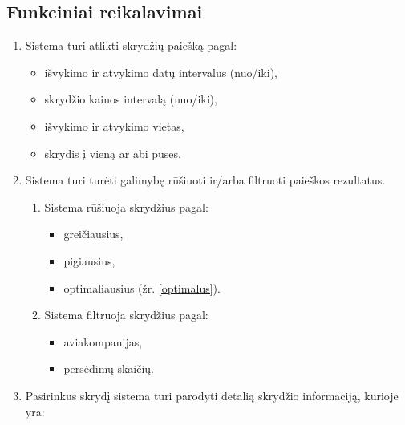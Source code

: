 \documentclass{VUMIFPSkursinis}
\begin{document}
            \subsection{Funkciniai reikalavimai}
                \begin{enumerate}[label=\textbf{FR\arabic*}.]
                	\subsubsection{Bendri sistemos funkciniai reikalavimai}
                		\item Sistema turi atlikti skrydžių paiešką pagal:
                    	\begin{itemize}
                    		\item išvykimo ir atvykimo datų intervalus (nuo/iki),
                    		\item skrydžio kainos intervalą (nuo/iki),
                    		\item išvykimo ir atvykimo vietas,
							\item skrydis į vieną ar abi puses.
                    	\end{itemize}
                    	\item Sistema turi turėti galimybę rūšiuoti ir/arba  filtruoti paieškos rezultatus.
                    	\begin{enumerate}[label*=\textbf{\arabic*}.]
                        	\item Sistema rūšiuoja skrydžius pagal:
                        	\begin{itemize}
                            	\item greičiausius,
                            	\item pigiausius,
                            	\item optimaliausius (žr. \ref{optimalus}).
                        	\end{itemize}
                        	\item Sistema filtruoja skrydžius pagal:
                        	\begin{itemize}
                            	\item aviakompanijas,
                            	\item persėdimų skaičių.
                        	\end{itemize}
                    	\end{enumerate}
                    	\item \label{skrydzio_info} Pasirinkus skrydį sistema turi parodyti detalią skrydžio informaciją, kurioje yra:

\end{enumerate}
\end{document}
